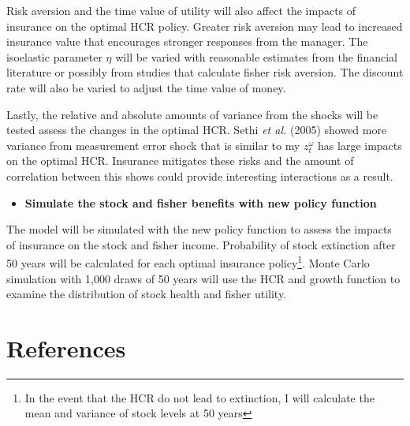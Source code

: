 \documentclass[
  letterpaper,
  DIV=11,
  numbers=noendperiod]{scrartcl}
\providecommand{\tightlist}{%
  \setlength{\itemsep}{0pt}\setlength{\parskip}{0pt}}\usepackage{longtable,booktabs,array}
\begin{document}
Risk aversion and the time value of utility will also affect the impacts
of insurance on the optimal HCR policy. Greater risk aversion may lead
to increased insurance value that encourages stronger responses from the
manager. The isoelastic parameter \(\eta\) will be varied with
reasonable estimates from the financial literature or possibly from
studies that calculate fisher risk aversion. The discount rate will also
be varied to adjust the time value of money.

Lastly, the relative and absolute amounts of variance from the shocks
will be tested assess the changes in the optimal HCR. Sethi \emph{et
al.} (2005) showed more variance from measurement error shock that is
similar to my \(z_t^\omega\) has large impacts on the optimal HCR.
Insurance mitigates these risks and the amount of correlation between
this shows could provide interesting interactions as a result.

\begin{itemize}
\tightlist
\item
  \textbf{Simulate the stock and fisher benefits with new policy
  function}
\end{itemize}

The model will be simulated with the new policy function to assess the
impacts of insurance on the stock and fisher income. Probability of
stock extinction after 50 years will be calculated for each optimal
insurance policy\footnote{In the event that the HCR do not lead to
  extinction, I will calculate the mean and variance of stock levels at
  50 years}. Monte Carlo simulation with 1,000 draws of 50 years will
use the HCR and growth function to examine the distribution of stock
health and fisher utility.

\newpage{}

\hypertarget{references}{%
\section*{References}\label{references}}
\end{document}
